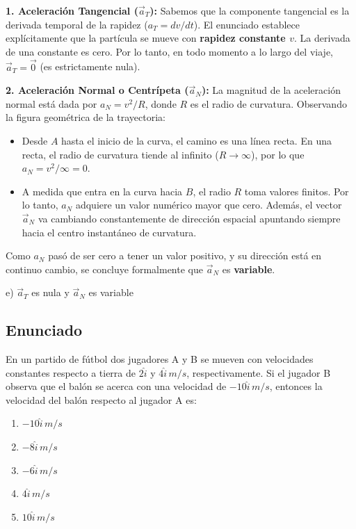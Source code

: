 \documentclass[12pt, a4paper]{article}
\begin{document}
\textbf{1. Aceleración Tangencial ($\vec{a}_T$):}
Sabemos que la componente tangencial es la derivada temporal de la rapidez ($a_T = dv/dt$). 
El enunciado establece explícitamente que la partícula se mueve con \textbf{rapidez constante $v$}. La derivada de una constante es cero. Por lo tanto, en todo momento a lo largo del viaje, $\vec{a}_T = \vec{0}$ (es estrictamente nula).

\textbf{2. Aceleración Normal o Centrípeta ($\vec{a}_N$):}
La magnitud de la aceleración normal está dada por $a_N = v^2/R$, donde $R$ es el radio de curvatura.
Observando la figura geométrica de la trayectoria:
\begin{itemize}
    \item Desde $A$ hasta el inicio de la curva, el camino es una línea recta. En una recta, el radio de curvatura tiende al infinito ($R \to \infty$), por lo que $a_N = v^2/\infty = 0$.
    \item A medida que entra en la curva hacia $B$, el radio $R$ toma valores finitos. Por lo tanto, $a_N$ adquiere un valor numérico mayor que cero. Además, el vector $\vec{a}_N$ va cambiando constantemente de dirección espacial apuntando siempre hacia el centro instantáneo de curvatura.
\end{itemize}
Como $a_N$ pasó de ser cero a tener un valor positivo, y su dirección está en continuo cambio, se concluye formalmente que $\vec{a}_N$ es \textbf{variable}.

\begin{tcolorbox}[colback=green!5!white, colframe=green!50!black, title=Respuesta Final]
\centering \Large e) $\vec{a}_T$ es nula y $\vec{a}_N$ es variable
\end{tcolorbox}

\newpage

\subsection*{Enunciado}
En un partido de fútbol dos jugadores A y B se mueven con velocidades constantes respecto a tierra de $2\hat{i}$ y $4\hat{i}\,\si{m/s}$, respectivamente. Si el jugador B observa que el balón se acerca con una velocidad de $-10\hat{i}\,\si{m/s}$, entonces la velocidad del balón respecto al jugador A es:
\begin{enumerate}[label=\alph*)]
    \item $-10\hat{i}\,\si{m/s}$
    \item $-8\hat{i}\,\si{m/s}$
    \item $-6\hat{i}\,\si{m/s}$
    \item $4\hat{i}\,\si{m/s}$
    \item $10\hat{i}\,\si{m/s}$
\end{enumerate}
\end{document}
